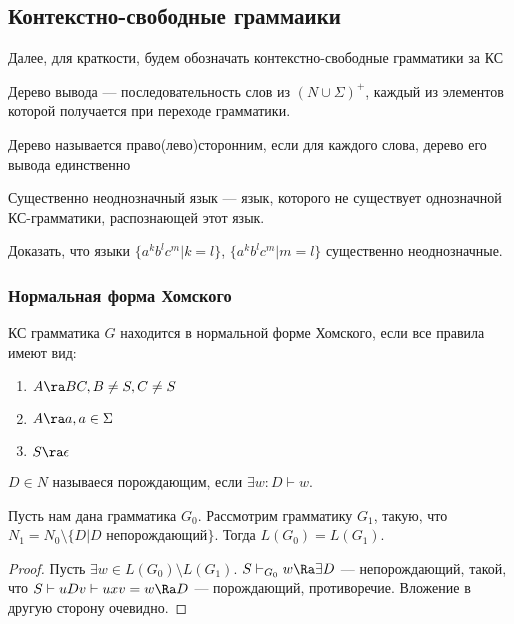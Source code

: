\subsection{Контекстно-свободные граммаики}

Далее, для краткости, будем обозначать контекстно-свободные грамматики за КС

\begin{definition}
    Дерево вывода --- последовательность слов из \((N \cup \Sigma)^+\), каждый из элементов которой получается при переходе грамматики.
\end{definition}

\begin{definition}
    Дерево называется право(лево)сторонним, если для каждого слова, дерево его вывода единственно
\end{definition}

\begin{definition}
    Существенно неоднозначный язык --- язык, которого не существует однозначной КС-грамматики, распознающей этот язык.
\end{definition}

\begin{problem}
    Доказать, что языки \(\{a^kb^lc^m | k = l\}\), \(\{a^kb^lc^m | m = l\}\) существенно неоднозначные.
\end{problem}

\subsubsection{Нормальная форма Хомского}

\begin{definition}
    КС грамматика \(G\) находится в нормальной форме Хомского, если все правила имеют вид:
    \begin{enumerate}
        \item \(A \ra BC, B \ne S, C \ne S\)
        \item \(A \ra a, a \in \Sigma\)
        \item \(S \ra \epsilon\)
    \end{enumerate}
\end{definition}

\begin{definition}
    \(D \in N\) называеся порождающим, если \(\exists w: D \vdash w\).
\end{definition}

\begin{proposition}
    Пусть нам дана грамматика \(G_0\). Рассмотрим грамматику \(G_1\), такую, что \(N_1 = N_0 \setminus \{D | D \text{ непорождающий}\}\). Тогда \(L(G_0) = L(G_1)\).
\end{proposition}
\begin{proof}
    Пусть \(\exists w \in L(G_0) \setminus L(G_1)\). \(S \vdash_{G_0} w \Ra \exists D\) --- непорождающий, такой, что \(S \vdash uDv \vdash uxv = w \Ra D\) --- порождающий, противоречие. Вложение в другую сторону очевидно.
\end{proof}
